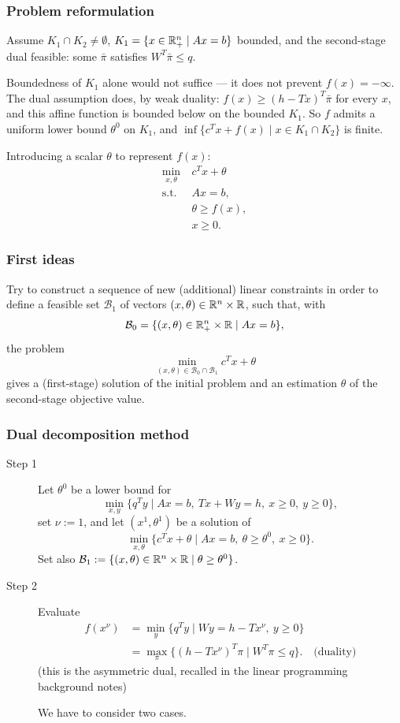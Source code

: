 \documentclass[aspectratio=169]{beamer}
\begin{document}
\begin{frame}
\frametitle{Problem reformulation}

Assume $K_1 \cap K_2 \ne \emptyset$, $K_1 = \lbrace x \in {\mathbb{R}}^n_+ \mid Ax = b \rbrace$ bounded, and the {\red second-stage dual feasible}: some $\bar{\pi}$ satisfies $W^T\bar{\pi} \leq q$.

Boundedness of $K_1$ alone would not suffice --- it does not prevent $f(x) = -\infty$. The dual assumption does, by weak duality: $f(x) \geq (h-Tx)^T\bar{\pi}$ for every $x$, and this affine function is bounded below on the bounded $K_1$.
So $f$ admits a uniform lower bound $\theta^0$ on $K_1$, and $\inf \lbrace c^Tx + f(x) \mid x \in K_1 \cap K_2 \rbrace$ is finite.

Introducing a scalar $\theta$ to represent $f(x)$:
\begin{align*}
\min_{x, \theta}\ & c^Tx + \theta \\
\text{s.t. } & Ax = b, \\
& \theta \geq f(x), \\
& x \geq 0.
\end{align*}

\end{frame}

\begin{frame}
\frametitle{First ideas}

Try to construct a {\blue sequence of new (additional) linear constraints} in order to define a feasible set $\mathcal{B}_1$ of vectors $(x,\theta) \in {\mathbb{R}}^n \times {\mathbb{R}}$, such that, with
\[
\mathcal{B}_0 = \lbrace (x, \theta) \in {\mathbb{R}}^n_+ \times {\mathbb{R}} \mid Ax = b \rbrace,
\]
the problem
\[
\min_{(x,\theta) \in \mathcal{B}_0 \cap \mathcal{B}_1} c^Tx+\theta
\]
gives a (first-stage) solution of the initial problem and an estimation $\theta$ of the second-stage objective value.

\end{frame}

\begin{frame}
\frametitle{Dual decomposition method}
\begin{description}
\item[\red Step 1]
Let $\theta^0$ be a lower bound for
\[
\min_{x, y} \lbrace q^Ty \mid Ax = b,\ Tx+Wy = h,\ x \geq 0,\ y \geq 0 \rbrace,
\]
set $\nu := 1$, and let $(x^1, \theta^1)$ be a solution of
\[
\min_{x, \theta} \lbrace c^Tx + \theta \mid Ax = b,\ \theta \geq \theta^0,\ x \geq 0 \rbrace.
\]
Set also $\mathcal{B}_1 := \lbrace (x, \theta) \in {\mathbb{R}}^n \times {\mathbb{R}} \mid \theta \geq \theta^0 \rbrace$.
\item[\red Step 2]
Evaluate
\begin{align*}
f(x^{\nu}) &= \min_y \lbrace q^Ty \mid Wy = h-Tx^{\nu},\ y \geq 0 \rbrace \\
&= \max_{\pi} \lbrace (h-Tx^{\nu})^T\pi \mid W^T\pi \leq q \rbrace. \quad \text{(duality)}
\end{align*}
{\footnotesize (this is the asymmetric dual, recalled in the linear programming background notes)}

We have to consider two cases.
\end{description}
\end{frame}
\end{document}
